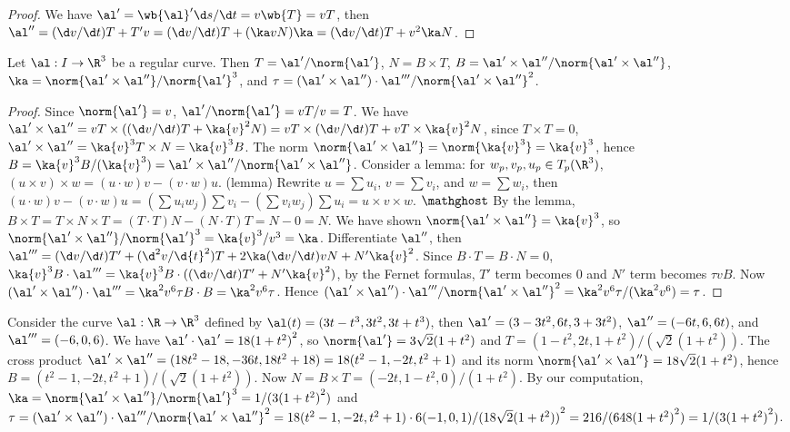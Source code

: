 \documentclass[10pt]{article}
\begin{document}
\begin{proof}
    We have $\al'=\wb{\al}'\d s/\d t=v\wb{T}=vT$, then $\al''=(\d v/\d t)T+T'v=(\d v/\d t)T+(\ka vN)\ka=(\d v/\d t)T+{v}^{2}\ka N$.
\end{proof}
\begin{proposition}
    Let $\al:I\to{\R}^{3}$ be a regular curve. Then $T=\al'/\norm{\al'}$, $N=B\times T$, $B=\al'\times\al''/\norm{\al'\times\al''}$, $\ka=\norm{\al'\times\al''}/{\norm{\al'}}^{3}$, and $\tau=(\al'\times\al'')\cdot\al'''/{\norm{\al'\times\al''}}^{2}$.
\end{proposition}
\begin{proof}
    Since $\norm{\al'}=v$, $\al'/\norm{\al'}=vT/v=T$. We have $\al'\times\al''=vT\times((\d v/\d t)T+\ka{v}^{2}N)=vT\times(\d v/\d t)T+vT\times\ka{v}^{2}N$, since $T\times T=0$, $\al'\times\al''=\ka{v}^{3}T\times N=\ka{v}^{3}B$. The norm $\norm{\al'\times\al''}=\norm{\ka{v}^{3}}=\ka{v}^{3}$, hence $B=\ka{v}^{3}B/(\ka{v}^{3})=\al'\times\al''/\norm{\al'\times\al''}$. Consider a lemma: for ${w}_{p},{v}_{p},{u}_{p}\in{T}_{p}({\R}^{3})$, $(u\times v)\times w=(u\cdot w)v-(v\cdot w)u$. (lemma) Rewrite $u=\sum{u}_{i}$, $v=\sum{v}_{i}$, and $w=\sum{w}_{i}$, then $(u\cdot w)v-(v\cdot w)u=(\sum{u}_{i}{w}_{j})\sum{v}_{i}-(\sum{v}_{i}{w}_{j})\sum{u}_{i}=u\times v\times w$. $\mathghost$ By the lemma, $B\times T=T\times N\times T=(T\cdot T)N-(N\cdot T)T=N-0=N$. We have shown $\norm{\al'\times\al''}=\ka{v}^{3}$, so $\norm{\al'\times\al''}/{\norm{\al'}}^{3}=\ka{v}^{3}/{v}^{3}=\ka$. Differentiate $\al''$, then $\al'''=(\d v/\d t)T'+({\d}^{2}v/\d{t}^{2})T+2\ka(\d v/\d t)vN+N'\ka{v}^{2}$. Since $B\cdot T=B\cdot N=0$, $\ka{v}^{3}B\cdot\al'''=\ka{v}^{3}B\cdot((\d v/\d t)T'+N'\ka{v}^{2})$, by the Fernet formulas, $T'$ term becomes 0 and $N'$ term becomes $\tau vB$. Now $(\al'\times\al'')\cdot\al'''={\ka}^{2}{v}^{6}\tau B\cdot B={\ka}^{2}{v}^{6}\tau$. Hence $(\al'\times\al'')\cdot\al'''/{\norm{\al'\times\al''}}^{2}={\ka}^{2}{v}^{6}\tau/({\ka}^{2}{v}^{6})=\tau$.
\end{proof}
\begin{example}
    Consider the curve $\al:\R\to{\R}^{3}$ defined by $\al(t)=(3t-{t}^{3},3{t}^{2},3t+{t}^{3})$, then $\al'=(3-3{t}^{2},6t,3+3{t}^{2})$, $\al''=(-6t,6,6t)$, and $\al'''=(-6,0,6)$. We have $\al'\cdot\al'=18{(1+{t}^{2})}^{2}$, so $\norm{\al'}=3\sqrt{2}(1+{t}^{2})$ and $T=(1-{t}^{2},2t,1+{t}^{2})/(\sqrt{2}(1+{t}^{2}))$. The cross product $\al'\times\al''=(18{t}^{2}-18,-36t,18{t}^{2}+18)=18({t}^{2}-1,-2t,{t}^{2}+1)$ and its norm $\norm{\al'\times\al''}=18\sqrt{2}(1+{t}^{2})$, hence $B=({t}^{2}-1,-2t,{t}^{2}+1)/(\sqrt{2}(1+{t}^{2}))$. Now $N=B\times T=(-2t,1-{t}^{2},0)/(1+{t}^{2})$. By our computation, $\ka=\norm{\al'\times\al''}/{\norm{\al'}}^{3}=1/(3{(1+{t}^{2})}^{2})$ and $\tau=(\al'\times\al'')\cdot\al'''/{\norm{\al'\times\al''}}^{2}=18({t}^{2}-1,-2t,{t}^{2}+1)\cdot 6(-1,0,1)/{(18\sqrt{2}(1+{t}^{2}))}^{2}=216/(648{(1+{t}^{2})}^{2})=1/(3{(1+{t}^{2})}^{2})$.
\end{example}
\end{document}
